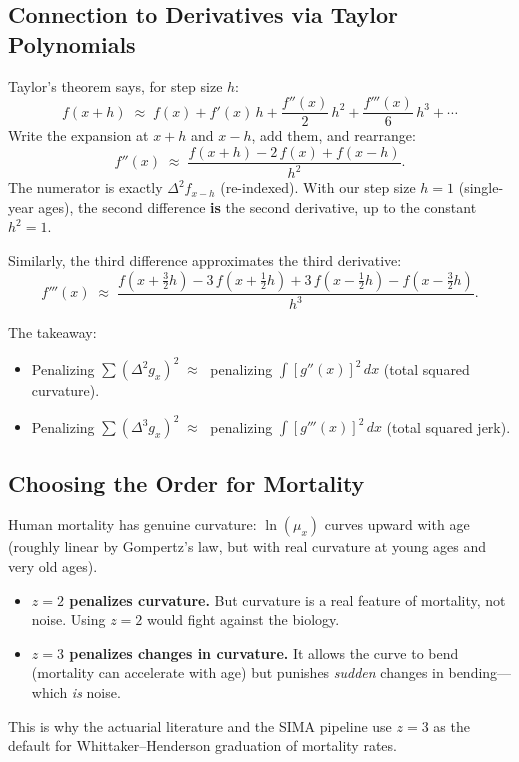 \documentclass[11pt,a4paper]{article}
\begin{document}
\subsection{Connection to Derivatives via Taylor Polynomials}

\begin{intuition}
Taylor's theorem says, for step size $h$:
\[
  f(x+h) \;\approx\; f(x) + f'(x)\,h + \frac{f''(x)}{2}\,h^2 + \frac{f'''(x)}{6}\,h^3 + \cdots
\]
Write the expansion at $x+h$ and $x-h$, add them, and rearrange:
\[
  f''(x) \;\approx\; \frac{f(x+h) - 2\,f(x) + f(x-h)}{h^2}.
\]
The numerator is exactly $\Delta^2 f_{x-h}$ (re-indexed).  With our step size $h=1$ (single-year ages), the second difference \textbf{is} the second derivative, up to the constant $h^2 = 1$.

Similarly, the third difference approximates the third derivative:
\[
  f'''(x) \;\approx\; \frac{f(x+\tfrac{3}{2}h) - 3\,f(x+\tfrac{1}{2}h) + 3\,f(x-\tfrac{1}{2}h) - f(x-\tfrac{3}{2}h)}{h^3}.
\]

The takeaway:
\begin{itemize}[nosep]
  \item Penalizing $\sum (\Delta^2 g_x)^2 \;\approx\;$ penalizing $\int [g''(x)]^2\,dx$ (total squared curvature).
  \item Penalizing $\sum (\Delta^3 g_x)^2 \;\approx\;$ penalizing $\int [g'''(x)]^2\,dx$ (total squared jerk).
\end{itemize}
\end{intuition}

\subsection{Choosing the Order for Mortality}

\begin{application}[Why $z=3$ Is Standard for Mortality Graduation]
Human mortality has genuine curvature: $\ln(\mu_x)$ curves upward with age (roughly linear by Gompertz's law, but with real curvature at young ages and very old ages).

\begin{itemize}[nosep]
  \item \textbf{$z=2$ penalizes curvature.}  But curvature is a real feature of mortality, not noise.  Using $z=2$ would fight against the biology.
  \item \textbf{$z=3$ penalizes changes in curvature.}  It allows the curve to bend (mortality can accelerate with age) but punishes \emph{sudden} changes in bending---which \emph{is} noise.
\end{itemize}

This is why the actuarial literature and the SIMA pipeline use $z=3$ as the default for Whittaker--Henderson graduation of mortality rates.
\end{application}
\end{document}
